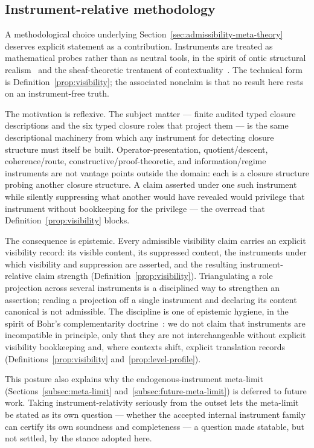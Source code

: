 \documentclass[11pt]{article}
\theoremstyle{definition}
\begin{document}
\subsection{Instrument-relative methodology}\label{subsec:discussion-instrument-relative}

A methodological choice underlying
Section~\ref{sec:admissibility-meta-theory} deserves explicit
statement as a contribution. Instruments are treated as mathematical
probes rather than as neutral tools, in the spirit of ontic structural
realism~\citep{LadymanRoss2007} and the sheaf-theoretic treatment of
contextuality~\citep{AbramskyBrandenburger2011}. The technical form
is Definition~\ref{prop:visibility}; the associated nonclaim is that
no result here rests on an instrument-free truth.

The motivation is reflexive. The subject matter --- finite audited
typed closure descriptions and the six typed closure roles that
project them --- is the same descriptional machinery from which any
instrument for detecting closure structure must itself be built.
Operator-presentation, quotient/descent, coherence/route,
constructive/proof-theoretic, and information/regime instruments are
not vantage points outside the domain: each is a closure structure
probing another closure structure. A claim asserted under one such
instrument while silently suppressing what another would have
revealed would privilege that instrument without bookkeeping for the
privilege --- the overread that Definition~\ref{prop:visibility}
blocks.

The consequence is epistemic. Every admissible visibility claim carries an
explicit visibility record: its visible content, its suppressed
content, the instruments under which visibility and suppression are
asserted, and the resulting instrument-relative claim strength
(Definition~\ref{prop:visibility}). Triangulating a role projection
across several instruments is a disciplined way to strengthen an
assertion; reading a projection off a single instrument and declaring
its content canonical is not admissible. The discipline is one of
epistemic hygiene, in the spirit of Bohr's complementarity
doctrine~\citep{Bohr1958}: we do not claim that instruments are
incompatible in principle, only that they are not interchangeable
without explicit visibility bookkeeping and, where contexts shift,
explicit translation records
(Definitions~\ref{prop:visibility} and~\ref{prop:level-profile}).

This posture also explains why the endogenous-instrument meta-limit
(Sections~\ref{subsec:meta-limit} and~\ref{subsec:future-meta-limit})
is deferred to future work. Taking instrument-relativity seriously
from the outset lets the meta-limit be stated as its own question ---
whether the accepted internal instrument family can certify its own
soundness and completeness --- a question made statable, but not
settled, by the stance adopted here.
\end{document}
